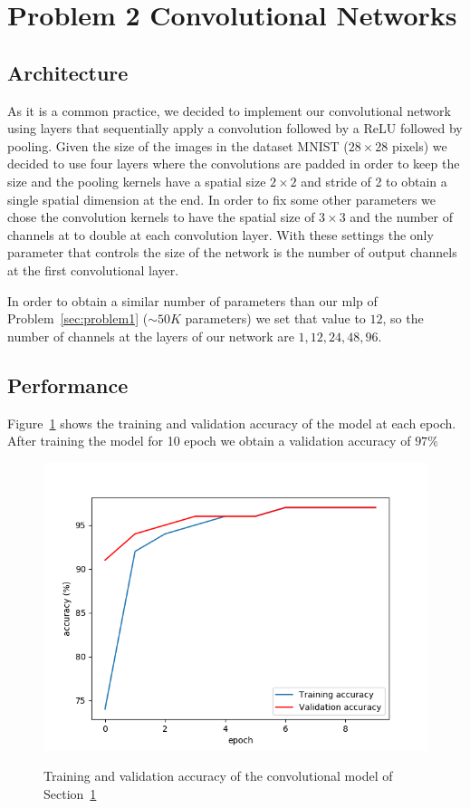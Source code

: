 \documentclass[a4paper]{article}
\begin{document}
\section{Problem 2 Convolutional Networks}
\label{sec:problem2}
\subsection{Architecture}
As it is a common practice, we decided to implement our convolutional network using layers that sequentially apply a convolution followed by a ReLU followed by pooling.
Given the size of the images in the dataset MNIST ($28\times28$ pixels) we decided to use four layers where the convolutions are padded in order to keep the size and the pooling kernels have a spatial size $2\times2$ and stride of 2 to obtain a single spatial dimension at the end. In order to fix some other parameters we chose the convolution kernels to have the spatial size of $3\times3$ and the number of channels at to double at each convolution layer. With these settings the only parameter that controls the size of the network is the number of output channels at the first convolutional layer. 

In order to obtain a similar number of parameters than our mlp of Problem~\ref{sec:problem1} ($\sim50K$ parameters) we set that value to $12$, so the number of channels at the layers of our network are  $1,12,24,48,96$. 
\subsection{Performance}
Figure~\ref{fig:CNN_accuracy} shows the training and validation accuracy of the model at each epoch. After training the model for 10 epoch we obtain a validation accuracy of $97\%$

\begin{figure}
\centering
\includegraphics[width=1\textwidth]{P2_CNN_accuracy}
\label{fig:CNN_accuracy}
\caption{Training and validation accuracy of the convolutional model of Section~\ref{sec:problem2}}
\end{figure}
\end{document}
